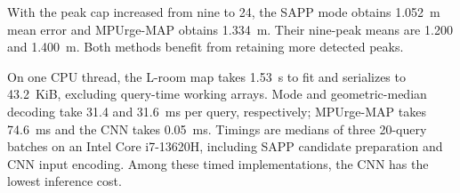 With the peak cap increased from nine to 24, the SAPP mode obtains 1.052~m mean error and MPUrge-MAP obtains 1.334~m. Their nine-peak means are 1.200 and 1.400~m. Both methods benefit from retaining more detected peaks.

On one CPU thread, the L-room map takes 1.53~s to fit and serializes to 43.2~KiB, excluding query-time working arrays. Mode and geometric-median decoding take 31.4 and 31.6~ms per query, respectively; MPUrge-MAP takes 74.6~ms and the CNN takes 0.05~ms. Timings are medians of three 20-query batches on an Intel Core i7-13620H, including SAPP candidate preparation and CNN input encoding. Among these timed implementations, the CNN has the lowest inference cost.
